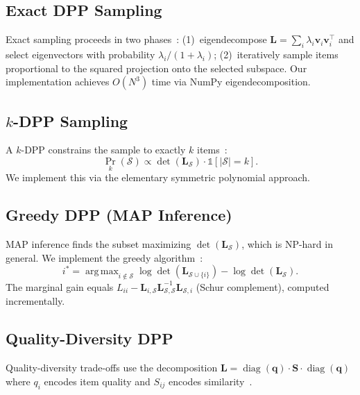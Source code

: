 \documentclass[11pt]{article}
\DeclareMathOperator*{\argmax}{arg\,max}
\DeclareMathOperator{\diag}{diag}
\begin{document}
\subsection{Exact DPP Sampling}
\label{sec:exact-dpp}

Exact sampling proceeds in two phases~\citep{hough2006determinantal}:
(1)~eigendecompose $\mathbf{L} = \sum_i \lambda_i \mathbf{v}_i \mathbf{v}_i^\top$
and select eigenvectors with probability $\lambda_i / (1 + \lambda_i)$;
(2)~iteratively sample items proportional to the squared projection onto
the selected subspace. Our implementation achieves $O(N^3)$ time via NumPy
eigendecomposition.

\subsection{$k$-DPP Sampling}

A $k$-DPP constrains the sample to exactly $k$
items~\citep{kulesza2011kdpp}:
\begin{equation}
\Pr_k(\mathcal{S}) \propto \det(\mathbf{L}_\mathcal{S}) \cdot \mathbb{1}[|\mathcal{S}| = k].
\end{equation}
We implement this via the elementary symmetric polynomial approach.

\subsection{Greedy DPP (MAP Inference)}

MAP inference finds the subset maximizing $\det(\mathbf{L}_\mathcal{S})$,
which is NP-hard in general. We implement the greedy
algorithm~\citep{gillenwater2012near}:
\begin{equation}
i^* = \argmax_{i \notin \mathcal{S}} \log \det(\mathbf{L}_{\mathcal{S} \cup \{i\}}) - \log\det(\mathbf{L}_\mathcal{S}).
\end{equation}
The marginal gain equals $L_{ii} - \mathbf{L}_{i,\mathcal{S}} \mathbf{L}_{\mathcal{S},\mathcal{S}}^{-1} \mathbf{L}_{\mathcal{S},i}$
(Schur complement), computed incrementally.

\subsection{Quality-Diversity DPP}

Quality-diversity trade-offs use the decomposition
$\mathbf{L} = \diag(\mathbf{q}) \cdot \mathbf{S} \cdot \diag(\mathbf{q})$
where $q_i$ encodes item quality and $S_{ij}$ encodes
similarity~\citep{kulesza2012determinantal}.
\end{document}
